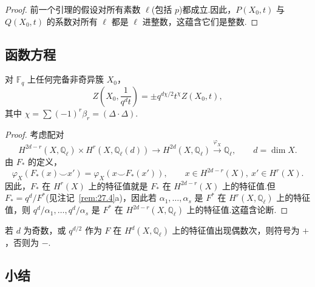 \begin{proof}
前一个引理的假设对所有素数 $\ell$(包括 $p$)都成立.因此，$P(X_0, t)$ 与 $Q(X_0, t)$ 的系数对所有 $\ell$ 都是 $\ell$ 进整数，这蕴含它们是整数.
\end{proof}

\subsection*{函数方程}

\begin{theorem}\label{thm:27.12}
对 $\mathbb{F}_q$ 上任何完备非奇异簇 $X_0$，
\[
Z\left( X_0, \frac{1}{q^{d}t} \right) = \pm q^{d\chi/2} t^{\chi} Z(X_0, t),
\]
其中 $\chi = \sum (-1)^{r}\beta_r = (\Delta \cdot \Delta)$.
\end{theorem}

\begin{proof}
考虑配对
\[
H^{2d-r}(X, \mathbb{Q}_{\ell}) \times H^{r}(X, \mathbb{Q}_{\ell}(d)) \to H^{2d}(X, \mathbb{Q}_{\ell}) \xrightarrow{\varphi_X} \mathbb{Q}_{\ell}, \qquad d = \dim X.
\]
由 $F_{*}$ 的定义，
\[
\varphi_X(F_{*}(x) \smile x') = \varphi_X(x \smile F_{*}(x')), \qquad x \in H^{2d-r}(X), \ x' \in H^{r}(X).
\]
因此，$F_{*}$ 在 $H^{r}(X)$ 上的特征值就是 $F_{*}$ 在 $H^{2d-r}(X)$ 上的特征值.但 $F_{*} = q^{d}/F^{*}$(见注记~\ref{rem:27.4}a)，因此若 $\alpha_1, \ldots, \alpha_s$ 是 $F^{*}$ 在 $H^{r}(X, \mathbb{Q}_{\ell})$ 上的特征值，则 $q^{d}/\alpha_1, \ldots, q^{d}/\alpha_s$ 是 $F^{*}$ 在 $H^{2d-r}(X, \mathbb{Q}_{\ell})$ 上的特征值.这蕴含论断.
\end{proof}

\begin{remark}\label{rem:27.13}
若 $d$ 为奇数，或 $q^{d/2}$ 作为 $F$ 在 $H^{d}(X, \mathbb{Q}_{\ell})$ 上的特征值出现偶数次，则符号为 $+$，否则为 $-$.
\end{remark}

\subsection*{小结}

